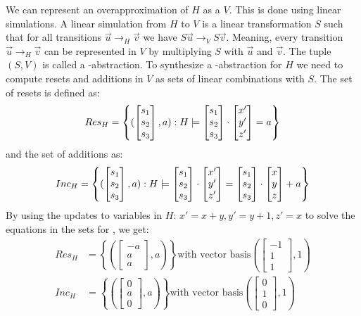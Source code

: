 We can represent an overapproximation of $H$ as a \qvasr $V$. This is done using linear simulations. A linear simulation from $H$ to $V$ is a linear transformation $S$ such that for all transitions $\vec{u} \rightarrow_H \vec{v}$ we have $S\vec{u} \rightarrow_V S\vec{v}$. Meaning, every transition $\vec{u} \rightarrow_H \vec{v}$ can be represented in $V$ by multiplying $S$ with $\vec{u}$ and $\vec{v}$. The tuple $(S, V)$ is called a \qvasr-abstraction. To synthesize a \qvasr-abstraction for $H$ we need to compute resets and additions in $V$ as sets of linear combinations with $S$. The set of resets is defined as: 
\begin{equation*}
	Res_H = \left\{ (\begin{bmatrix} s_1 \\ s_2 \\ s_3 \end{bmatrix}, a) : H \models \begin{bmatrix} s_1 \\ s_2 \\ s_3 \end{bmatrix} \cdot \begin{bmatrix} x' \\ y' \\ z' \end{bmatrix} = a \right\}	
\end{equation*}
 and the set of additions as:
\begin{equation*}
	Inc_H = \left\{(\begin{bmatrix} s_1 \\ s_2 \\ s_3 \end{bmatrix}, a) : H \models \begin{bmatrix} s_1 \\ s_2 \\ s_3 \end{bmatrix} \cdot \begin{bmatrix} x' \\ y' \\ z' \end{bmatrix} = \begin{bmatrix} s_1 \\ s_2 \\ s_3 \end{bmatrix} \cdot \begin{bmatrix} x \\ y \\ z \end{bmatrix} + a\right\}	
\end{equation*}
By using the updates to variables in $H$: $x' = x + y, y' = y + 1, z' = x$ to solve the equations in the sets for \s, we get:
\begin{align*}
	Res_H &= \left\{ (\begin{bmatrix} -a \\ a \\ a \end{bmatrix}, a) \right\} \text{with vector basis} (\begin{bmatrix} -1 \\ 1 \\ 1 \end{bmatrix}, 1) \\
	Inc_H &= \left\{ (\begin{bmatrix} 0 \\ a \\ 0 \end{bmatrix}, a) \right\} \text{with vector basis} (\begin{bmatrix} 0 \\ 1 \\ 0 \end{bmatrix}, 1)
\end{align*}








